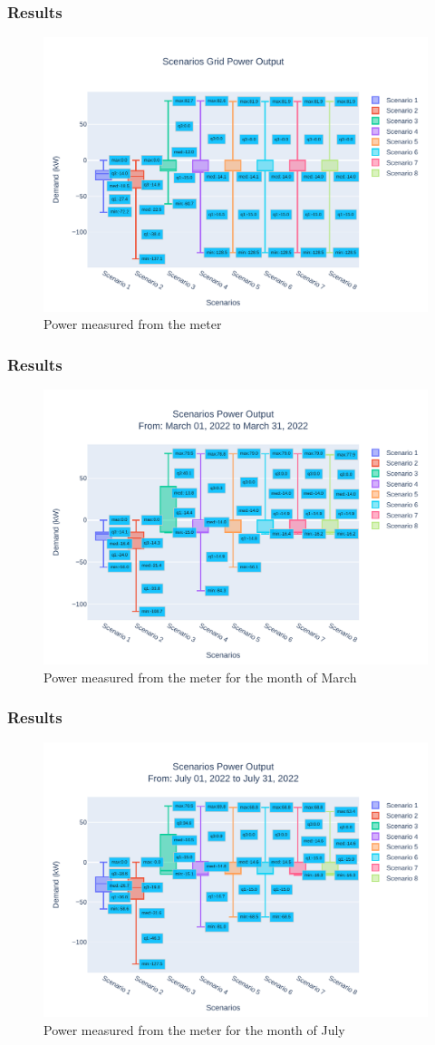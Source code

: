 \documentclass[aspectratio=169, 8 pt]{beamer}
\begin{document}
	
		\begin{frame}
			\frametitle{Results}
			\begin{figure}
				\centering
				\includegraphics[width=0.7\linewidth]{Fig/scenarios_power_output_boxplot}
				\caption{Power measured from the meter}
				\label{fig:scenariospoweroutputboxplot}
			\end{figure}
		\end{frame}
		\begin{frame}
			\frametitle{Results}
			\begin{figure}
				\centering
				\includegraphics[width=0.7\linewidth]{Fig/0_Scn_Output_Run_3_Mar_01_2022_to_Mar_31_2022}
				\caption{Power measured from the meter for the month of March}
				\label{fig:0scnoutputrun2mar012022tomar312022}
			\end{figure}
		\end{frame}
		\begin{frame}
			\frametitle{Results}
			\begin{figure}
				\centering
				\includegraphics[width=0.7\linewidth]{Fig/4_Scn_Output_Run_3_Jul_01_2022_to_Jul_31_2022}
				\caption{Power measured from the meter for the month of July}
				\label{fig:4scnoutputrun2jul012022tojul312022}
			\end{figure}
		\end{frame}
\end{document}
